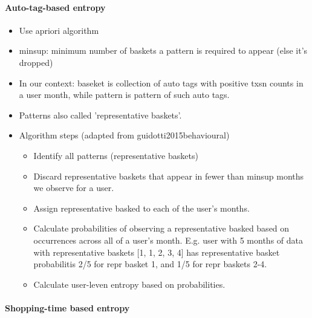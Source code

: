 \paragraph{Auto-tag-based entropy}
\label{par:auto_tag_entropy}

\begin{itemize}
    \item Use apriori algorithm

    \item minsup: minimum number of baskets a pattern is required to appear
        (else it's dropped)

    \item In our context: baseket is collection of auto tags with positive txsn
        counts in a user month, while pattern is pattern of such auto tags.

    \item Patterns also called 'representative baskets'.

    \item Algorithm steps (adapted from guidotti2015behavioural)

        \begin{itemize}
            \item Identify all patterns (representative baskets)

            \item Discard representative baskets that appear in fewer than
                minsup months we observe for a user. 

            \item Assign representative basked to each of the user's months.

            \item Calculate probabilities of observing a representative basked
                based on occurrences across all of a user's month. E.g. user
                with 5 months of data with representative baskets [1, 1, 2, 3,
                4] has representative basket probabilitis 2/5 for repr basket
                1, and 1/5 for repr baskets 2-4.

            \item Calculate user-leven entropy based on probabilities.
        \end{itemize}
\end{itemize}


\paragraph{Shopping-time based entropy}
\label{par:shopping_time_based_entropy}

